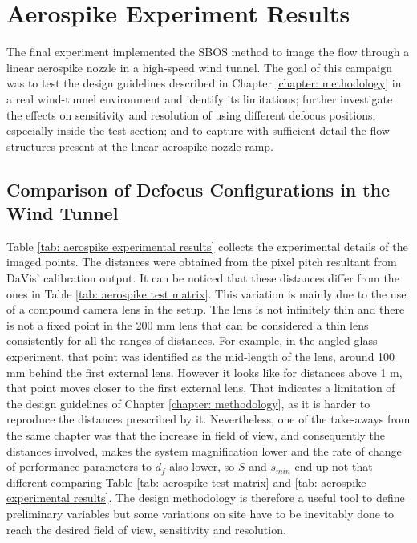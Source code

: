 \section{Aerospike Experiment Results}
\label{section: Aerospike Experiment Results}

The final experiment implemented the SBOS method to image the flow through a linear aerospike nozzle in a high-speed wind tunnel. The goal of this campaign was to test the design guidelines described in Chapter \ref{chapter: methodology} in a real wind-tunnel environment and identify its limitations; further investigate the effects on sensitivity and resolution of using different defocus positions, especially inside the test section; and to capture with sufficient detail the flow structures present at the linear aerospike nozzle ramp.

\subsection{Comparison of Defocus Configurations in the Wind Tunnel}
\label{subsection: Aerospike Optical Configurations}

Table \ref{tab: aerospike experimental results} collects the experimental details of the imaged points. The distances were obtained from the pixel pitch resultant from DaVis' calibration output. It can be noticed that these distances differ from the ones in Table \ref{tab: aerospike test matrix}. This variation is mainly due to the use of a compound camera lens in the setup. The lens is not infinitely thin and there is not a fixed point in the 200 mm lens that can be considered a thin lens consistently for all the ranges of distances. For example, in the angled glass experiment, that point was identified as the mid-length of the lens, around 100 mm behind the first external lens. However it looks like for distances above 1 m, that point moves closer to the first external lens. That indicates a limitation of the design guidelines of Chapter \ref{chapter: methodology}, as it is harder to reproduce the distances prescribed by it. Nevertheless, one of the take-aways from the same chapter was that the increase in field of view, and consequently the distances involved, makes the system magnification lower and the rate of change of performance parameters to $d_f$ also lower, so $S$ and $s_{min}$ end up not that different comparing Table \ref{tab: aerospike test matrix} and \ref{tab: aerospike experimental results}. The design methodology is therefore a useful tool to define preliminary variables but some variations on site have to be inevitably done to reach the desired field of view, sensitivity and resolution.

